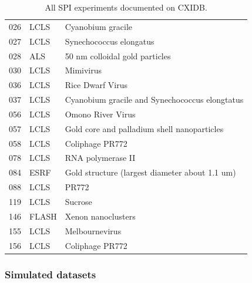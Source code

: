 \begin{table}
{\begin{tabular}{  | l l l | }
        026      & LCLS         & Cyanobium gracile                                               \\
        027      & LCLS         & Synechococcus elongatus                                         \\
        028      & ALS          & 50 nm colloidal gold particles                                  \\
        030      & LCLS         & Mimivirus                                                       \\
        036      & LCLS         & Rice Dwarf Virus                                                \\
        037      & LCLS         & Cyanobium gracile and Synechococcus elongtatus                  \\
        056      & LCLS         & Omono River Virus                                               \\
        057      & LCLS         & Gold core and palladium shell nanoparticles                     \\
        058      & LCLS         & Coliphage PR772                                                 \\
        078      & LCLS         & RNA polymerase II                                               \\
        084      & ESRF         & Gold structure (largest diameter about 1.1 um)                  \\
        088      & LCLS         & PR772                                                           \\
        119      & LCLS         & Sucrose                                                         \\
        146      & FLASH        & Xenon nanoclusters                                              \\
        155      & LCLS         & Melbournevirus                                                  \\
        156      & LCLS         & Coliphage PR772                                                 \\
        \hline
    \end{tabular}
}
\caption{All SPI experiments documented on CXIDB.}
\label{tb: SPI experiments}
\end{table}


\subsubsection{Simulated datasets}

